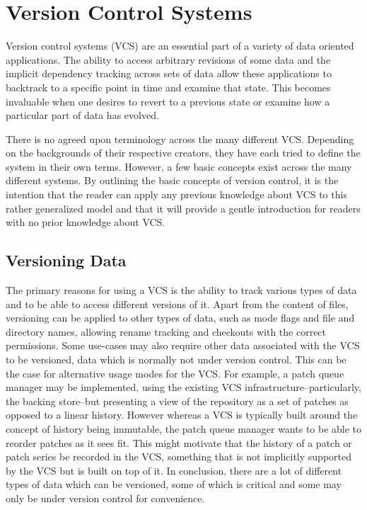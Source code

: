 \section{Version Control Systems}
\label{sec:vcs}

Version control systems (VCS) are an essential part of a variety of
data oriented applications. The ability to access arbitrary revisions of
some data and the implicit dependency tracking across sets of data
allow these applications to backtrack to a specific point in time and
examine that state. This becomes invaluable when one desires to revert to
a previous state or examine how a particular part of data has evolved.


There is no agreed upon terminology across the many different
VCS. Depending on the backgrounds of their respective creators, they
have each tried to define the system in their own terms. However, a
few basic concepts exist across the many different systems.  By
outlining the basic concepts of version control, it is the intention
that the reader can apply any previous knowledge about VCS to this
rather generalized model and that it will provide a gentle
introduction for readers with no prior knowledge about VCS.

\subsection{Versioning Data}

The primary reasons for using a VCS is the ability to track various
types of data and to be able to access different versions of it.
Apart from the content of files, versioning can be applied to other
types of data, such as mode flags and file and directory names,
allowing rename tracking and checkouts with the correct permissions.
Some use-cases may also require other data associated with the VCS to
be versioned, data which is normally not under version control. This
can be the case for alternative usage modes for the VCS.  For example,
a patch queue manager may be implemented, using the existing VCS
infrastructure--particularly, the backing store--but presenting a view
of the repository as a set of patches as opposed to a linear history.
However whereas a VCS is typically built around the concept of history
being immutable, the patch queue manager wants to be able to reorder
patches as it sees fit. This might motivate that the history of a
patch or patch series be recorded in the VCS, something that is not
implicitly supported by the VCS but is built on top of it. In
conclusion, there are a lot of different types of data which can be
versioned, some of which is critical and some may only be under
version control for convenience.

